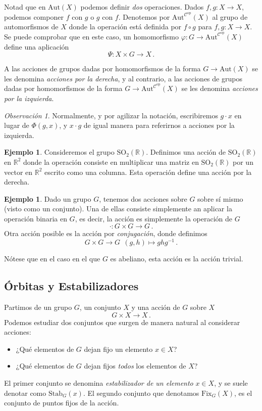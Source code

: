 \documentclass[a4paper,11pt]{amsart}
\newcommand{\ccal}{\mathcal{C}}
\newcommand{\oposite}{\ccal^{\mathrm{op}}}
\theoremstyle{plain}
\theoremstyle{definition}
\newtheorem{ej}[thm]{Ejemplo}
\theoremstyle{remark}
\newtheorem*{rem}{Observación}
\begin{document}
Notad que en $\text{Aut}(X)$ podemos definir \textit{dos} operaciones. Dados $f, g \colon X \to X$, podemos componer $f$ con $g$ o $g$ con $f$. Denotemos por $\text{Aut}^{\oposite}(X)$ al grupo de automorfismos de $X$ donde la operación está definida por $f \circ g$ para $f, g \colon X \to X$. Se puede comprobar que en este caso, un homomorfismo $\varphi \colon G \to \text{Aut}^{\oposite}(X)$ define una aplicación 
\[ \Psi \colon X \times G \to X \, .\]

A las acciones de grupos dadas por homomorfismos de la forma $G \to \text{Aut}(X)$ se les denomina \textit{acciones por la derecha}, y al contrario, a las acciones de grupos dadas por homomorfismos de la forma $G \to \text{Aut}^{\oposite}(X)$ se les denomina \textit{acciones por la izquierda}.

\begin{rem}
Normalmente, y por agilizar la notación, escribiremos $g \cdot x$ en lugar de $\Phi(g, x)$, y $x \cdot g$ de igual manera para referirnos a acciones por la izquierda.
\end{rem}


\begin{ej}
\label{ejemplo_so2}
Consideremos el grupo $\text{SO}_2(\mathbb{R})$. Definimos una acción de $\text{SO}_2(\mathbb{R})$ en $\mathbb{R}^2$ donde la operación consiste en multiplicar una matriz en $\text{SO}_2(\mathbb{R})$ por un vector en $\mathbb{R}^2$ escrito como una columna. Esta operación define una acción por la derecha.
\end{ej}


\begin{ej}
Dado un grupo $G$, tenemos dos acciones sobre $G$ sobre sí mismo (visto como un conjunto). Una de ellas consiste simplemente an aplicar la operación binaria en $G$, es decir, la acción es simplemente la operación de $G$
\[ \cdot \colon G \times G \to G \, .\]
Otra acción posible es la acción por \textit{conjugación}, donde definimos 
\[ G \times G \to G \, \; (g, h) \mapsto ghg^{-1} \, . \]

Nótese que en el caso en el que $G$ es abeliano, esta acción es la acción trivial. 
\end{ej}

\subsection{Órbitas y Estabilizadores}

Partimos de un grupo $G$, un conjunto $X$ y una acción de $G$ sobre $X$
\[ G \times X \to X \, .\]
Podemos estudiar dos conjuntos que surgen de manera natural al considerar acciones: 
\begin{itemize}
    \item ¿Qué elementos de $G$ dejan fijo un elemento $x \in X$?
    \item ¿Qué elementos de $G$ dejan fijos \textit{todos} los elementos de $X$?
\end{itemize}
El primer conjunto se denomina \textit{estabilizador de un elemento} $x \in X$, y se suele denotar como $\text{Stab}_G(x)$. El segundo conjunto que denotamos $\text{Fix}_G(X)$, es el conjunto de puntos fijos de la acción. 
\end{document}
